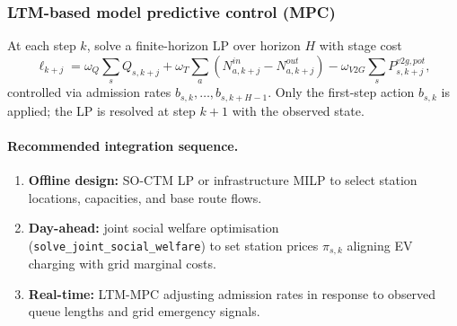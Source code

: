 \subsubsection{LTM-based model predictive control (MPC)}
\label{sec:traffic-mpc}

At each step $k$, solve a finite-horizon LP over horizon $H$ with stage cost
\begin{equation}
  \ell_{k+j} = \omega_Q \sum_s Q_{s,k+j}
             + \omega_T \sum_a (N^{in}_{a,k+j} - N^{out}_{a,k+j})
             - \omega_{V2G} \sum_s P^{v2g,pot}_{s,k+j},
  \label{eq:mpc-stage-cost}
\end{equation}
controlled via admission rates $b_{s,k}, \ldots, b_{s,k+H-1}$.
Only the first-step action $b_{s,k}$ is applied; the LP is resolved
at step $k+1$ with the observed state.

\paragraph{Recommended integration sequence.}
\begin{enumerate}
  \item \textbf{Offline design:} SO-CTM LP or infrastructure MILP to
        select station locations, capacities, and base route flows.
  \item \textbf{Day-ahead:} joint social welfare optimisation
        (\texttt{solve\_joint\_social\_welfare}) to set station prices
        $\pi_{s,k}$ aligning EV charging with grid marginal costs.
  \item \textbf{Real-time:} LTM-MPC adjusting admission rates in
        response to observed queue lengths and grid emergency signals.
\end{enumerate}

